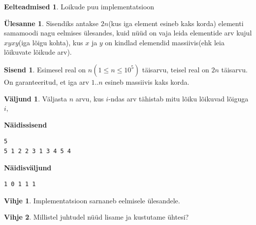 \documentclass{trkut}
\theoremstyle{definition}
\newtheorem*{prereq}{Eelteadmised}
\newtheorem*{vihje}{Vihje}
\newtheorem*{Input}{Sisend}
\newtheorem*{Output}{Väljund}
\newtheorem*{Text}{Ülesanne}
\begin{document}
\begin{prereq}
Loikude puu implementatsioon
\end{prereq}
\begin{Text}
Sisendiks antakse $2n$(kus iga element esineb kaks korda) elementi samamoodi nagu eelmises ülesandes, kuid nüüd on vaja leida elementide arv kujul $xyxy$(iga lõigu kohta), kus $x$ ja $y$ on kindlad elemendid massiivis(ehk leia lõikuvate lõikude arv).

\parencite{inseg}
\end{Text}
\begin{Input}
Esimesel real on $n$$(1\le n\le 10^5)$ täisarvu, teisel real on $2n$ täisarvu. On garanteeritud, et iga arv $1..n$ esineb massiivis kaks korda.
\end{Input}
\begin{Output}
Väljasta $n$ arvu, kus $i$-ndas arv tähistab mitu lõiku lõikuvad lõiguga $i$,
\end{Output}

\textbf{Näidissisend}

\begin{verbatim}
5
5 1 2 2 3 1 3 4 5 4
\end{verbatim}

\textbf{Näidisväljund}

\begin{verbatim}
1 0 1 1 1 
\end{verbatim}


\begin{vihje}
Implementatsioon sarnaneb eelmisele ülesandele.
\end{vihje}

\begin{vihje}
Millistel juhtudel nüüd lisame ja kustutame ühtesi?
\end{vihje}
\end{document}
